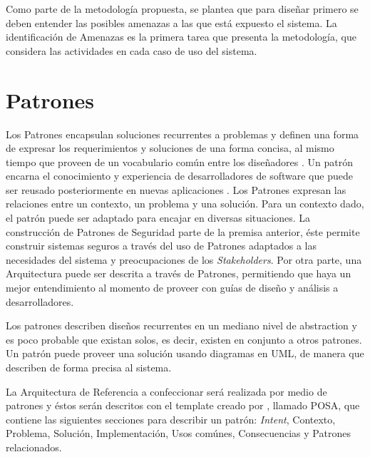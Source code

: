 Como parte de la metodología propuesta, se plantea que para diseñar primero se deben entender las posibles amenazas a las que está expuesto el sistema. La identificación de Amenazas \cite{braz2008eliciting,fernandez2006defining} es la primera tarea que presenta la metodología, que considera las actividades en cada caso de uso del sistema.


\section{Patrones}
\label{chap2:Patt}
Los Patrones encapsulan soluciones recurrentes a problemas y definen una forma de expresar los requerimientos y soluciones de una forma concisa, al mismo tiempo que proveen de un vocabulario común entre los diseñadores \cite{buschman1996system}. Un patrón encarna el conocimiento y experiencia de desarrolladores de software que puede ser reusado posteriormente en nuevas aplicaciones \cite{fernandez2004methodology, fernandez2013security}. Los Patrones expresan las relaciones entre un contexto, un problema y una solución. Para un contexto dado, el patrón puede ser adaptado para encajar en diversas situaciones. La construcción de Patrones de Seguridad parte de la premisa anterior, éste permite construir sistemas seguros a través del uso de Patrones adaptados a las necesidades del sistema y preocupaciones de los \textit{Stakeholders}. Por otra parte, una Arquitectura puede ser descrita a través de Patrones, permitiendo que haya un mejor entendimiento al momento de proveer con guías de diseño y análisis a desarrolladores.

Los patrones describen diseños recurrentes en un mediano nivel de abstraction y es poco probable que existan solos, es decir, existen en conjunto a otros patrones. Un patrón puede proveer una solución usando diagramas en UML, de manera que describen de forma precisa al sistema.

La Arquitectura de Referencia a confeccionar será realizada por medio de patrones y éstos serán descritos con el template creado por \cite{buschman1996system}, llamado POSA, que contiene las siguientes secciones para describir un patrón: \textit{Intent}, Contexto, Problema, Solución, Implementación, Usos comúnes, Consecuencias y Patrones relacionados.




